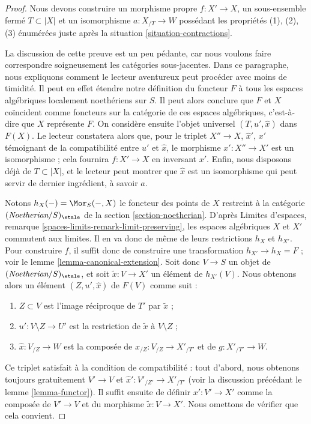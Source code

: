 \begin{proof}
Nous devons construire un morphisme propre $f : X' \to X$, un sous-ensemble
fermé $T \subset |X|$ et un isomorphisme $a : X_{/T} \to W$ possédant les
propriétés (1), (2), (3) énumérées juste après la situation
\ref{situation-contractions}.

\medskip\noindent
La discussion de cette preuve est un peu pédante, car nous voulons faire
correspondre soigneusement les catégories sous-jacentes. Dans ce paragraphe,
nous expliquons comment le lecteur aventureux peut procéder avec moins de
timidité. Il peut en effet étendre notre définition du foncteur $F$ à tous les
espaces algébriques localement noethériens sur $S$. Il peut alors conclure que
$F$ et $X$ coïncident comme foncteurs sur la catégorie de ces espaces
algébriques, c'est-à-dire que $X$ représente $F$. On considère ensuite l'objet
universel $(T, u', \hat x)$ dans $F(X)$. Le lecteur constatera alors que, pour
le triplet $X'' \to X$, $\hat x'$, $x'$ témoignant de la compatibilité entre
$u'$ et $\hat x$, le morphisme $x' : X'' \to X'$ est un isomorphisme ; cela
fournira $f : X' \to X$ en inversant $x'$. Enfin, nous disposons déjà de
$T \subset |X|$, et le lecteur peut montrer que $\hat x$ est un isomorphisme
qui peut servir de dernier ingrédient, à savoir $a$.

\medskip\noindent
Notons $h_X(-) = \Mor_S(-, X)$ le foncteur des points de $X$ restreint à la
catégorie $(\textit{Noetherian}/S)_\etale$ de la section
\ref{section-noetherian}. D'après Limites d'espaces, remarque
\ref{spaces-limits-remark-limit-preserving}, les espaces algébriques $X$ et
$X'$ commutent aux limites. Il en va donc de même de leurs restrictions $h_X$
et $h_{X'}$. Pour construire $f$, il suffit donc de construire une
transformation $h_{X'} \to h_X = F$ ; voir le lemme
\ref{lemma-canonical-extension}. Soit donc $V \to S$ un objet de
$(\textit{Noetherian}/S)_\etale$, et soit $\tilde x : V \to X'$ un élément de
$h_{X'}(V)$. Nous obtenons alors un élément $(Z, u', \hat x)$ de $F(V)$ comme
suit :
\begin{enumerate}
\item $Z \subset V$ est l'image réciproque de $T'$ par $\tilde x$ ;
\item $u' : V \setminus Z \to U'$ est la restriction de
$\tilde x$ à $V \setminus Z$ ;
\item $\hat x : V_{/Z} \to W$ est la composée de
$x_{/Z} : V_{/Z} \to X'_{/T'}$ et de $g : X'_{/T'} \to W$.
\end{enumerate}
Ce triplet satisfait à la condition de compatibilité : tout d'abord, nous
obtenons toujours gratuitement $V' \to V$ et
$\hat x' : V'_{/Z'} \to X'_{/T'}$ (voir la discussion précédant le lemme
\ref{lemma-functor}). Il suffit ensuite de définir $x' : V' \to X'$ comme la
composée de $V' \to V$ et du morphisme $\tilde x : V \to X'$. Nous omettons
de vérifier que cela convient.


\end{proof}
